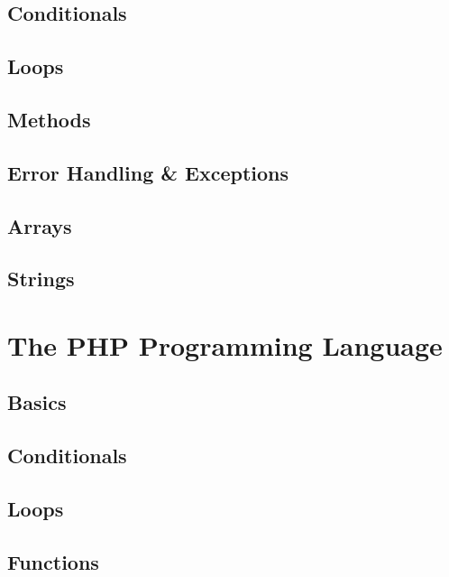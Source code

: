 \documentclass[12pt]{scrbook}
\begin{document}
\chapter{Conditionals}


\chapter{Loops}


\chapter{Methods}


\chapter{Error Handling \& Exceptions}
\label{chapter:java:errorHandling}


\chapter{Arrays}
\label{chapter:java:arrays}


\chapter{Strings}
\label{chapter:java:strings}


\part{The PHP Programming Language}

\chapter{Basics}


\chapter{Conditionals}


\chapter{Loops}


\chapter{Functions}

\end{document}
